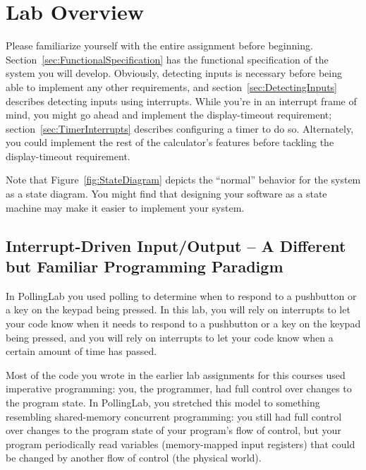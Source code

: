 \section{Lab Overview}

Please familiarize yourself with the entire assignment before beginning.
Section~\ref{sec:FunctionalSpecification} has the functional specification of the system you will develop.
Obviously, detecting inputs is necessary before being able to implement any other requirements, and section~\ref{sec:DetectingInputs} describes detecting inputs using interrupts.
While you're in an interrupt frame of mind, you might go ahead and implement the display-timeout requirement; section~\ref{sec:TimerInterrupts} describes configuring a timer to do so.
Alternately, you could implement the rest of the calculator's features before tackling the display-timeout requirement.

Note that Figure~\ref{fig:StateDiagram} depicts the ``normal'' behavior for the system as a state diagram.
You might find that designing your software as a state machine may make it easier to implement your system.


\subsection{Interrupt-Driven Input/Output -- A Different but Familiar Programming Paradigm}

In PollingLab you used polling to determine when to respond to a pushbutton or a key on the keypad being pressed.
In this lab, you will rely on interrupts to let your code know when it needs to respond to a pushbutton or a key on the keypad being pressed, and you will rely on interrupts to let your code know when a certain amount of time has passed.

\vspace{.25cm}

Most of the code you wrote in the earlier lab assignments for this courses used
imperative programming: you, the programmer, had full control over changes to
the program state. In PollingLab, you stretched this model to something
resembling shared-memory concurrent programming: you still had full control
over changes to the program state of your program's flow of control, but your
program periodically read variables (memory-mapped input registers) that could be
changed by another flow of control (the physical world).

